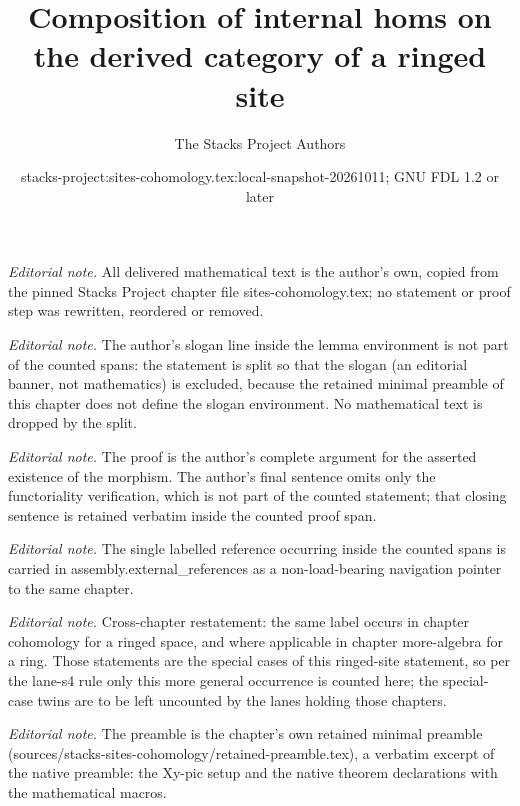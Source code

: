 \documentclass[10pt,a4paper]{amsart}
\title{Composition of internal homs on the derived category of a ringed site}
\author{The Stacks Project Authors}
\date{stacks-project:sites-cohomology.tex:local-snapshot-20261011; GNU FDL 1.2 or later}
\theoremstyle{plain}
\theoremstyle{definition}
\theoremstyle{remark}
\numberwithin{equation}{subsection}
\begin{document}
\maketitle
\noindent\textit{Editorial note.} All delivered mathematical text is the author's own, copied from the pinned Stacks Project chapter file sites-cohomology.tex; no statement or proof step was rewritten, reordered or removed.\par\medskip
\noindent\textit{Editorial note.} The author's slogan line inside the lemma environment is not part of the counted spans: the statement is split so that the slogan (an editorial banner, not mathematics) is excluded, because the retained minimal preamble of this chapter does not define the slogan environment. No mathematical text is dropped by the split.\par\medskip
\noindent\textit{Editorial note.} The proof is the author's complete argument for the asserted existence of the morphism. The author's final sentence omits only the functoriality verification, which is not part of the counted statement; that closing sentence is retained verbatim inside the counted proof span.\par\medskip
\noindent\textit{Editorial note.} The single labelled reference occurring inside the counted spans is carried in assembly.external\_references as a non-load-bearing navigation pointer to the same chapter.\par\medskip
\noindent\textit{Editorial note.} Cross-chapter restatement: the same label occurs in chapter cohomology for a ringed space, and where applicable in chapter more-algebra for a ring. Those statements are the special cases of this ringed-site statement, so per the lane-s4 rule only this more general occurrence is counted here; the special-case twins are to be left uncounted by the lanes holding those chapters.\par\medskip
\noindent\textit{Editorial note.} The preamble is the chapter's own retained minimal preamble (sources/stacks-sites-cohomology/retained-preamble.tex), a verbatim excerpt of the native preamble: the Xy-pic setup and the native theorem declarations with the mathematical macros.\par\medskip
\end{document}

